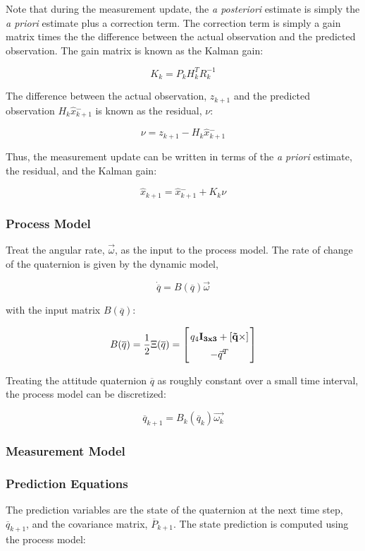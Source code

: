 \documentclass{article}
\newcommand{\mat}[2][ccccccccccccccccccccccccccccccccccccccccccccc]{\left[
        \arraycolsep=1.2pt\def\arraystretch{1.5}
        \begin{array}{#1} #2 \\ 
        \end{array} 
        \right]}
\begin{document}
\begin{flushleft}
Note that during the measurement update, the \textit{a posteriori} estimate is simply the \textit{a priori} estimate plus a correction term. The correction term is simply a gain matrix times the the difference between the actual observation and the predicted observation. The gain matrix is known as the Kalman gain: 

$$ K_k = P_k H_k^{T} R_k^{-1} $$

The difference between the actual observation, $z_{k+1}$ and the predicted observation $H_k \hat{x}{^-_{k+1}}$ is known as the residual, $\nu$:

$$ \nu = z_{k+1} - H_k \hat{x}{^-_{k+1}} $$

Thus, the measurement update can be written in terms of the \textit{a priori} estimate, the residual, and the Kalman gain:

$$ \hat{x}_{k+1} = \hat{x}{^-_{k+1}} + K_k \nu $$

\subsubsection{Process Model}

Treat the angular rate, $\vec{\omega}$, as the input to the process model. The rate of change of the quaternion is given by the dynamic model, 

\[ \dot{\overline{q}} = B(\overline{q}) \vec{\omega} \]

with the input matrix $B(\overline{q})$: 

\[ B(\overline{q}) = \frac{1}{2} \Xi(\overline{q}) = \mat{q_4 \bf{I}_{3x3} + [\vec{q}\times] \\ -\vec{q}^T } \]

Treating the attitude quaternion $\overline{q}$ as roughly constant over a small time interval, the process model can be discretized: 

\[ \overline{q}_{k+1} = B_k(\overline{q}_k) \vec{\omega_k} \]

\subsubsection{Measurement Model}

\subsubsection{Prediction Equations}

The prediction variables are the state of the quaternion at the next time step, $\overline{q}_{k+1}$, and the covariance matrix, $\overline{P}_{k+1}$. The state prediction is computed using the process model: 


\end{flushleft}
\end{document}
